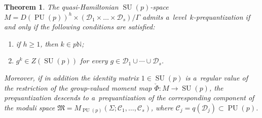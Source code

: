 \documentclass[11pt]{article}
\numberwithin{equation}{section}
\newtheorem{Theorem}{Theorem}[section]
\DeclareMathOperator{\SU}{SU}
\DeclareMathOperator{\PU}{PU}
\begin{document}
\begin{Theorem}
\label{thm:obs}
The quasi-Hamiltonian $\SU(p)$-space $M=D(\PU(p))^h \times (\mathcal{D}_1 \times \dots \times
\mathcal{D}_s)/{\Gamma} $ admits a~level~$k$-prequantization if and only if the following conditions are
satisfied:
\begin{enumerate}\itemsep=0pt
\item[$i)$]
\label{thm:obs-double}
if $h\geq 1$, then $k \in p{\mathbb{N}}$;
\item[$ii)$]
\label{thm:obs-conj}
$g^k \in Z(\SU(p))$ for every $\displaystyle g \in \mathcal{D}_1 \cup \cdots \cup \mathcal{D}_s$.
\end{enumerate}
Moreover, if in addition the identity matrix $1 \in \SU(p)$ is a~regular value of the restriction of the group-valued
moment map $\check{\Phi}:M\to \SU(p)$, the prequantization descends to a~prequantization of the corresponding component
of the moduli space $\mathfrak{M}=M_{\PU(p)}(\Sigma; \mathcal{C}_1, \ldots, \mathcal{C}_s)$, where
$\mathcal{C}_j=q(\mathcal{D}_j) \subset \PU(p)$.
\end{Theorem}
\end{document}
